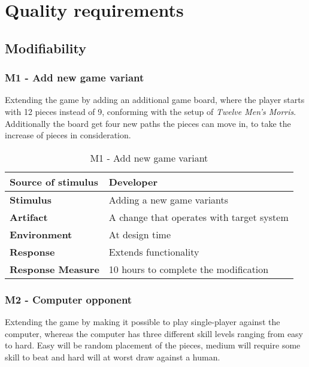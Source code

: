 \pagebreak

\section{Quality requirements}

\subsection{Modifiability}

\subsubsection{M1 - Add new game variant}

Extending the game by adding an additional game board, where the player starts with 12 pieces instead of 9, conforming with the setup of \emph{Twelve Men's Morris}. Additionally the board get four new paths the pieces can move in, to take the increase of pieces in consideration.

\begin{table}[h!]
\begin{tabular}{ | p{110pt} | p{250pt}  |}
\hline
\bf Source of stimulus &  Developer  \\ \hline
\bf Stimulus & Adding a new game variants \\ \hline 
\bf Artifact & A change that operates with target system  \\  \hline
\bf Environment & At design time \\ \hline
\bf Response & Extends functionality \\ \hline
\bf Response Measure & 10 hours to complete the modification \\ \hline

\end{tabular}
\caption{M1 - Add new game variant}
\end{table}

\subsubsection{M2 - Computer opponent}

Extending the game by making it possible to play single-player against the computer, whereas the computer has three different skill levels ranging from easy to hard. Easy will be random placement of the pieces, medium will require some skill to beat and hard will at worst draw against a human.

